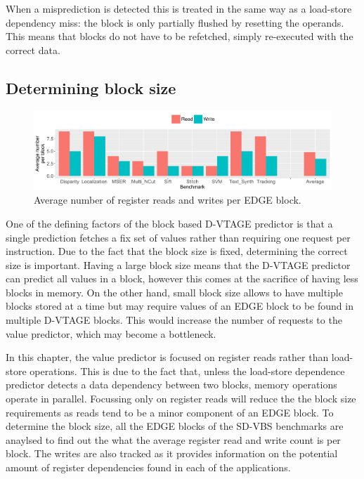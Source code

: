 When a misprediction is detected this is treated in the same way as a load-store dependency miss: the block is only partially flushed by resetting the operands.
This means that blocks do not have to be refetched, simply re-executed with the correct data.

\subsection{Determining block size}

\begin{figure}[t]
    \centering
    \includegraphics[width=1\textwidth]{chapter3/graphics/averageRegRead.pdf}

    \caption{Average number of register reads and writes per EDGE block.}
    \label{fig:edge_reg_read}
	\vspace{1em}
\end{figure}

One of the defining factors of the block based D-VTAGE predictor is that a single prediction fetches a fix set of values rather than requiring one request per instruction.
Due to the fact that the block size is fixed, determining the correct size is important.
Having a large block size means that the D-VTAGE predictor can predict all values in a block, however this comes at the sacrifice of having less blocks in memory.
On the other hand, small block size allows to have multiple blocks stored at a time but may require values of an EDGE block to be found in multiple D-VTAGE blocks.
This would increase the number of requests to the value predictor, which may become a bottleneck.

In this chapter, the value predictor is focused on register reads rather than load-store operations.
This is due to the fact that, unless the load-store dependence predictor detects a data dependency between two blocks, memory operations operate in parallel.
Focussing only on register reads will reduce the the block size requirements as reads tend to be a minor component of an EDGE block.
To determine the block size, all the EDGE blocks of the SD-VBS benchmarks are anaylsed to find out the what the average register read and write count is per block.
The writes are also tracked as it provides information on the potential amount of register dependencies found in each of the applications.

